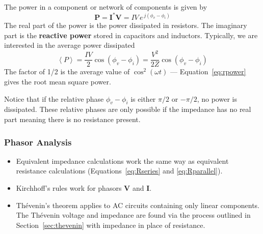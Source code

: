 \documentclass[11pt]{article}
\begin{document}
The power in a component or network of components is given by
\begin{equation}
  \mathbf{P} = \mathbf{I^*V} = IV \, e^{\,j(\phi_v - \phi_i)}
  \label{eq:complexpower}
\end{equation}
The real part of the power is the power dissipated in resistors. The
imaginary part is the \textbf{reactive power} stored in capacitors and
inductors. Typically, we are interested in the average power
dissipated
\begin{equation}
  \left< P \right> = \frac{IV}{2} \cos(\phi_v - \phi_i)
                   = \frac{V^2}{2Z} \cos(\phi_v - \phi_i)
  \label{eq:rpower}
\end{equation}
The factor of 1/2 is the average value of $\cos^2(\omega t)$ ---
Equation~\ref{eq:rpower} gives the root mean square power.

Notice that if the relative phase $\phi_v - \phi_i$ is either $\pi/2$
or $-\pi/2$, no power is dissipated. These relative phases are only
possible if the impedance has no real part meaning there is no
resistance present.


\begin{latexonly}
  \noindent
  \hrulefill
\end{latexonly}
\htmlrule
\subsubsection*{Phasor Analysis}
\begin{itemize}
\item Equivalent impedance calculations work the same way as
  equivalent resistance calculations (Equations~\ref{eq:Rseries}
  and \ref{eq:Rparallel}).

\item Kirchhoff's rules work for phasors $\mathbf{V}$ and
  $\mathbf{I}$.

\item Th\'{e}venin's theorem applies to AC circuits containing
  only linear components. The Th\'{e}venin voltage and impedance
  are found via the process outlined in Section~\ref{sec:thevenin}
  with impedance in place of resistance.
\end{itemize}
\begin{latexonly}
  \noindent
  \hrulefill
\end{latexonly}
\htmlrule
\end{document}
